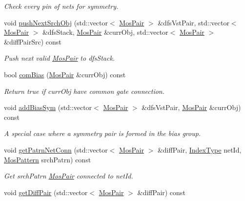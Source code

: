 \begin{DoxyCompactItemize}
\begin{DoxyCompactList}\small\item\em Check every pin of nets for symmetry. \end{DoxyCompactList}\item 
void \hyperlink{classSymDetect_a7f4cd1010a21da88d35abb89c6f33f00}{push\+Next\+Srch\+Obj} (std\+::vector$<$ \hyperlink{classMosPair}{Mos\+Pair} $>$ \&dfs\+Vst\+Pair, std\+::vector$<$ \hyperlink{classMosPair}{Mos\+Pair} $>$ \&dfs\+Stack, \hyperlink{classMosPair}{Mos\+Pair} \&curr\+Obj, std\+::vector$<$ \hyperlink{classMosPair}{Mos\+Pair} $>$ \&diff\+Pair\+Src) const
\begin{DoxyCompactList}\small\item\em Push next valid \hyperlink{classMosPair}{Mos\+Pair} to dfs\+Stack. \end{DoxyCompactList}\item 
bool \hyperlink{classSymDetect_a13ddc56c5e937097178352eb00d71cf3}{com\+Bias} (\hyperlink{classMosPair}{Mos\+Pair} \&curr\+Obj) const
\begin{DoxyCompactList}\small\item\em Return true if curr\+Obj have common gate connection. \end{DoxyCompactList}\item 
void \hyperlink{classSymDetect_a79b9b8042087a413df53daf4e5600728}{add\+Bias\+Sym} (std\+::vector$<$ \hyperlink{classMosPair}{Mos\+Pair} $>$ \&dfs\+Vst\+Pair, \hyperlink{classMosPair}{Mos\+Pair} \&curr\+Obj) const
\begin{DoxyCompactList}\small\item\em A special case where a symmetry pair is formed in the bias group. \end{DoxyCompactList}\item 
void \hyperlink{classSymDetect_aa6d2ec13048f8f7e18e659bf8ac31dee}{get\+Patrn\+Net\+Conn} (std\+::vector$<$ \hyperlink{classMosPair}{Mos\+Pair} $>$ \&diff\+Pair, \hyperlink{type_8h_a581e8093e28e7362f2b6937296190676}{Index\+Type} net\+Id, \hyperlink{type_8h_af19eddb079bfea723256710b029c38e8}{Mos\+Pattern} srch\+Patrn) const
\begin{DoxyCompactList}\small\item\em Get srch\+Patrn \hyperlink{classMosPair}{Mos\+Pair} connected to net\+Id. \end{DoxyCompactList}\item 
void \hyperlink{classSymDetect_af04b93dac7e090cef8e741d8d1812485}{get\+Diff\+Pair} (std\+::vector$<$ \hyperlink{classMosPair}{Mos\+Pair} $>$ \&diff\+Pair) const

\end{DoxyCompactItemize}
